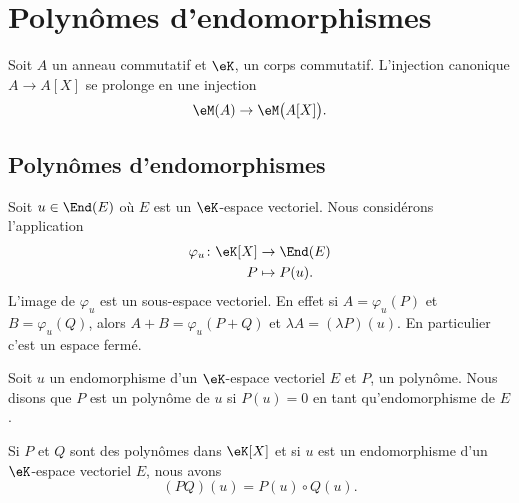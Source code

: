 \section{Polynômes d'endomorphismes}
\label{SECooUEQVooLBrRiE}

Soit \( A\) un anneau commutatif et \( \eK\), un corps commutatif. L'injection canonique \( A\to A[X]\) se prolonge en une injection
\begin{equation}
	\eM(A)\to\eM\big( A[X] \big).
\end{equation}

\subsection{Polynômes d'endomorphismes}

Soit \( u\in\End(E)\) où \( E\) est un \( \eK\)-espace vectoriel. Nous considérons l'application
\begin{equation}    \label{EqOVKooeMJuv}
	\begin{aligned}
		\varphi_u\colon \eK[X] & \to \End(E)   \\
		P                      & \mapsto P(u).
	\end{aligned}
\end{equation}
L'image de \( \varphi_u\) est un sous-espace vectoriel. En effet si \( A=\varphi_u(P)\) et \( B=\varphi_u(Q)\), alors \( A+B=\varphi_u(P+Q)\) et \( \lambda A=(\lambda P)(u)\). En particulier c'est un espace fermé.

Soit \( u\) un endomorphisme d'un \( \eK\)-espace vectoriel \( E\) et \( P\), un polynôme. Nous disons que \( P\) est un polynôme  de \( u\) si \( P(u)=0\) en tant qu'endomorphisme de \( E\).

\begin{lemma}       \label{LemQWvhYb}
	Si \( P\) et \( Q\) sont des polynômes dans \( \eK[X]\) et si \( u\) est un endomorphisme d'un \( \eK\)-espace vectoriel \( E\), nous avons
	\begin{equation}
		(PQ)(u)=P(u)\circ Q(u).
	\end{equation}
\end{lemma}

